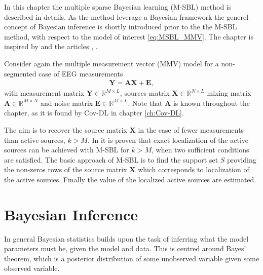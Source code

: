 In this chapter the multiple sparse Bayesian learning (M-SBL) method is described in details. As the method leverage a Bayesian framework the generel concept of Bayesian inference is shortly introduced prior to the the M-SBL method, with respect to the model of interest \eqref{eq:MSBL_MMV}. The chapter is inspired by \cite{phd_wipf} and the articles \cite{article_wipf}, \cite{Balkan2014}.

Consider again the multiple measurement vector (MMV) model for a non-segmented case of EEG measurements
\begin{align}\label{eq:MSBL_MMV}
\mathbf{Y} = \mathbf{AX} + \mathbf{E},
\end{align}
with measurement matrix $\mathbf{Y} \in \mathbb{R}^{M \times L}$, sources matrix $\mathbf{X} \in \mathbb{R}^{N \times L}$ mixing matrix $\mathbf{A} \in \mathbb{R}^{M \times N}$ and noise matrix $\mathbf{E} \in \mathbb{R}^{M \times L}$. Note that $\textbf{A}$ is known throughout the chapter, as it is found by Cov-DL in chapter \ref{ch:Cov-DL}.

The aim is to recover the source matrix $\mathbf{X}$ in the case of fewer measurements than active sources, $k > M$. 
In \cite{Balkan2014} it is proven that exact localization of the active sources can be achieved with M-SBL for $k > M$, when two sufficient conditions are satisfied.   
The basic approach of M-SBL is to find the support set $S$ providing the non-zeros rows of the source matrix $\mathbf{X}$ which corresponds to localization of the active sources. Finally the value of the localized active sources are estimated.  

\section{Bayesian Inference} 
In general Bayesian statistics builds upon the task of inferring what the model parameters must be, given the model and data.  
This is centred around Bayes' theorem, which is a posterior distribution of some unobserved variable given some observed variable.

